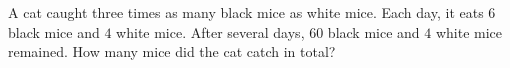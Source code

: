 A cat caught three times as many black mice as white mice. Each day, it eats $6$ black mice and $4$ white mice. After several days, $60$ black mice and $4$ white mice remained. How many mice did the cat catch in total?

